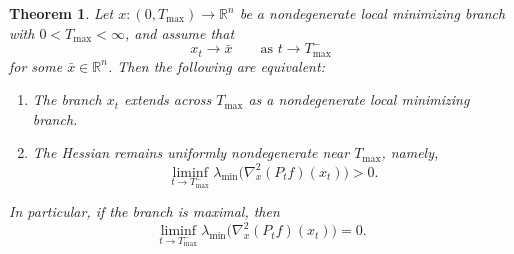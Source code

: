 \documentclass{article}
\newtheorem{theorem}{Theorem}[section]
\begin{document}
\begin{theorem}\label{thm:continuation-alternative}
Let $x:(0,T_{\max})\to\mathbb R^n$ be a nondegenerate local minimizing branch with $0<T_{\max}<\infty$, and assume that
$$
x_t\to \bar x
\qquad\text{as }t\to T_{\max}^-
$$
for some $\bar x\in\mathbb R^n$. Then the following are equivalent:
\begin{enumerate}
\item[(i)] The branch $x_t$ extends across $T_{\max}$ as a nondegenerate local minimizing branch.
\item[(ii)] The Hessian remains uniformly nondegenerate near $T_{\max}$, namely,
$$
\liminf_{t\to T_{\max}^-}\lambda_{\min}\bigl(\nabla_x^2(P_t f)(x_t)\bigr)>0.
$$
\end{enumerate}
In particular, if the branch is maximal, then
$$
\liminf_{t\to T_{\max}^-}\lambda_{\min}\bigl(\nabla_x^2(P_t f)(x_t)\bigr)=0.
$$
\end{theorem}
\end{document}
